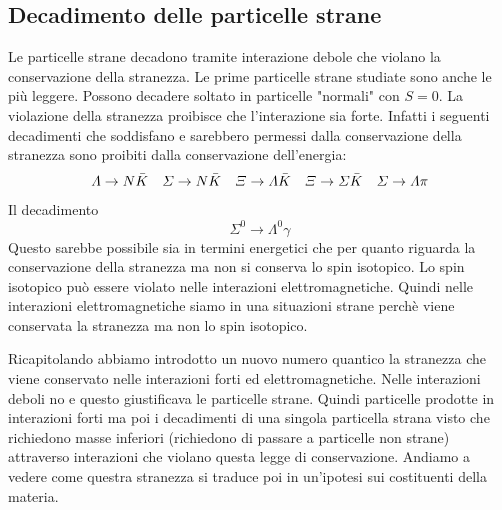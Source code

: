 \subsection{Decadimento delle particelle strane}
Le particelle strane decadono tramite interazione debole che violano la conservazione della stranezza. Le prime particelle strane studiate sono anche le più leggere. Possono decadere soltato in particelle "normali" con $S=0$. La violazione della stranezza proibisce che l'interazione sia forte. Infatti i seguenti decadimenti che soddisfano e sarebbero permessi dalla conservazione della stranezza sono proibiti dalla conservazione dell'energia:
\begin{equation*}
    \Lambda\to N\Bar{K} \quad \Sigma\to N\Bar{K} \quad \Xi\to \Lambda\Bar{K} \quad \Xi\to \Sigma\Bar{K} \quad \Sigma \to \Lambda\pi
\end{equation*}
Il decadimento 
\begin{equation*}
    \Sigma^0\to \Lambda^0\gamma
\end{equation*}
Questo sarebbe possibile sia in termini energetici che per quanto riguarda la conservazione della stranezza ma non si conserva lo spin isotopico. Lo spin isotopico può essere violato nelle interazioni elettromagnetiche. Quindi nelle interazioni elettromagnetiche siamo in una situazioni strane perchè viene conservata la stranezza ma non lo spin isotopico.

Ricapitolando abbiamo introdotto un nuovo numero quantico la stranezza che viene conservato nelle interazioni forti ed elettromagnetiche. Nelle interazioni deboli no e questo giustificava le particelle strane. Quindi particelle prodotte in interazioni forti ma poi i decadimenti di una singola particella strana visto che richiedono masse inferiori (richiedono di passare a particelle non strane) attraverso interazioni che violano questa legge di conservazione. Andiamo a vedere come questra stranezza si traduce poi in un'ipotesi sui costituenti della materia.
